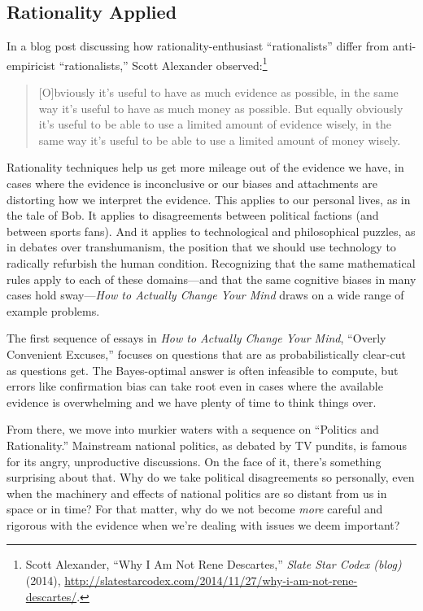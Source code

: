 \subsection{Rationality Applied}

{
 In a blog post discussing how rationality-enthusiast
``rationalists'' differ from
anti-empiricist ``rationalists,''
Scott Alexander observed:\footnote{Scott Alexander, ``Why I Am Not Rene
Descartes,'' \textit{Slate Star Codex (blog)} (2014),
\url{http://slatestarcodex.com/2014/11/27/why-i-am-not-rene-descartes/}.}}

\begin{quote}
{
 [O]bviously it's useful to have as much evidence
as possible, in the same way it's useful to have as
much money as possible. But equally obviously it's
useful to be able to use a limited amount of evidence wisely, in the
same way it's useful to be able to use a limited amount
of money wisely.}
\end{quote}

{
 Rationality techniques help us get more mileage out of the
evidence we have, in cases where the evidence is inconclusive or our
biases and attachments are distorting how we interpret the evidence.
This applies to our personal lives, as in the tale of Bob. It applies
to disagreements between political factions (and between sports fans).
And it applies to technological and philosophical puzzles, as in
debates over transhumanism, the position that we should use technology
to radically refurbish the human condition. Recognizing that the same
mathematical rules apply to each of these domains---and that the same
cognitive biases in many cases hold sway---\textit{How to Actually
Change Your Mind} draws on a wide range of example problems.}

{
 The first sequence of essays in \textit{How to Actually Change
Your Mind}, ``Overly Convenient
Excuses,'' focuses on questions that are as
probabilistically clear-cut as questions get. The Bayes-optimal answer
is often infeasible to compute, but errors like confirmation bias can
take root even in cases where the available evidence is overwhelming
and we have plenty of time to think things over.}

{
 From there, we move into murkier waters with a sequence on
``Politics and Rationality.''
Mainstream national politics, as debated by TV pundits, is famous for
its angry, unproductive discussions. On the face of it,
there's something surprising about that. Why do we take
political disagreements so personally, even when the machinery and
effects of national politics are so distant from us in space or in
time? For that matter, why do we not become \textit{more} careful and
rigorous with the evidence when we're dealing with
issues we deem important?}

